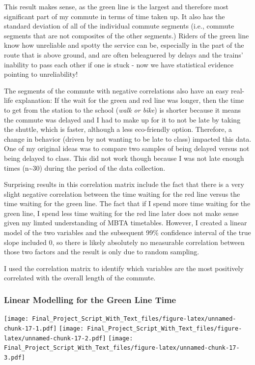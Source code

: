 \documentclass[
]{article}
\begin{document}
This result makes sense, as the green line is the largest and therefore
most significant part of my commute in terms of time taken up. It also
has the standard deviation of all of the individual commute segments
(i.e., commute segments that are not composites of the other segments.)
Riders of the green line know how unreliable and spotty the service can
be, especially in the part of the route that is above ground, and are
often beleaguered by delays and the trains' inability to pass each other
if one is stuck - now we have statistical evidence pointing to
unreliability!

The segments of the commute with negative correlations also have an easy
real-life explanation: If the wait for the green and red line was
longer, then the time to get from the station to the school (\emph{walk
or bike}) is shorter because it means the commute was delayed and I had
to make up for it to not be late by taking the shuttle, which is faster,
although a less eco-friendly option. Therefore, a change in behavior
(driven by not wanting to be late to class) impacted this data. One of
my original ideas was to compare two samples of being delayed versus not
being delayed to class. This did not work though because I was not late
enough times (n\textasciitilde30) during the period of the data
collection.

Surprising results in this correlation matrix include the fact that
there is a very slight negative correlation between the time waiting for
the red line versus the time waiting for the green line. The fact that
if I spend more time waiting for the green line, I spend less time
waiting for the red line later does not make sense given my limted
understanding of MBTA timetables. However, I created a linear model of
the two variables and the subsequent 99\% confidence interval of the
true slope included 0, so there is likely absolutely no measurable
correlation between those two factors and the result is only due to
random sampling.

I used the correlation matrix to identify which variables are the most
positively correlated with the overall length of the commute.

\hypertarget{linear-modelling-for-the-green-line-time}{%
\subsubsection{Linear Modelling for the Green Line
Time}\label{linear-modelling-for-the-green-line-time}}

\texttt{[image: Final\_Project\_Script\_With\_Text\_files/figure-latex/unnamed-chunk-17-1.pdf]}
\texttt{[image: Final\_Project\_Script\_With\_Text\_files/figure-latex/unnamed-chunk-17-2.pdf]}
\texttt{[image: Final\_Project\_Script\_With\_Text\_files/figure-latex/unnamed-chunk-17-3.pdf]}
\end{document}
